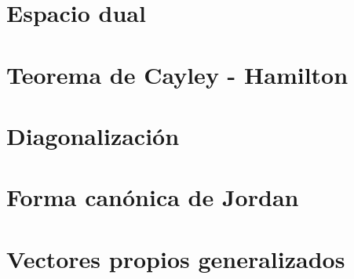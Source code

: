 
\section{Espacio dual}


\section{Teorema de Cayley - Hamilton}


\section{Diagonalización}


\section{Forma canónica de Jordan}


\section{Vectores propios generalizados}